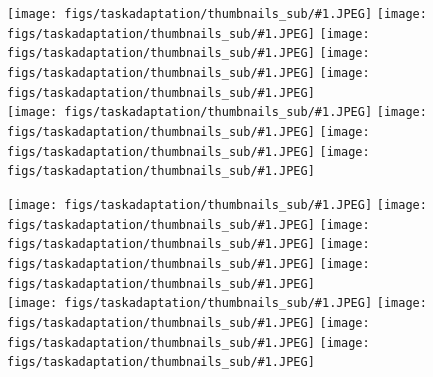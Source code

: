 \begin{figure}
    \centering
    \newcommand{\introim}[1]{\texttt{[image: figs/taskadaptation/thumbnails\_sub/\#1.JPEG]}}
    \newcommand{\introsep}{\hspace{0.005\linewidth}}
    \newcommand{\demoim}[1]{\texttt{[image: figs/taskadaptation/thumbnails\_sub/\#1.JPEG]}}
    \begin{minipage}{0.45\linewidth}
        \begin{flushright}
        \introim{34544}\introsep
        \introim{82396}\introsep
        \introim{66068}\introsep
        \introim{36749}\introsep
        \introim{67538}\\
        \introim{19914}\introsep
        \introim{22979}\introsep
        \introim{101078}\introsep
        \introim{45885}\vspace{0.05in}

        \introim{62437}\introsep
        \introim{90868}\introsep
        \introim{84585}\introsep
        \introim{12176}\introsep
        \introim{83447}\\
        \introim{16261}\introsep
        \introim{111956}\introsep
        \introim{57158}\introsep
        \introim{26210}\vspace{0.05in}


\end{flushright}
\end{minipage}
\end{figure}
